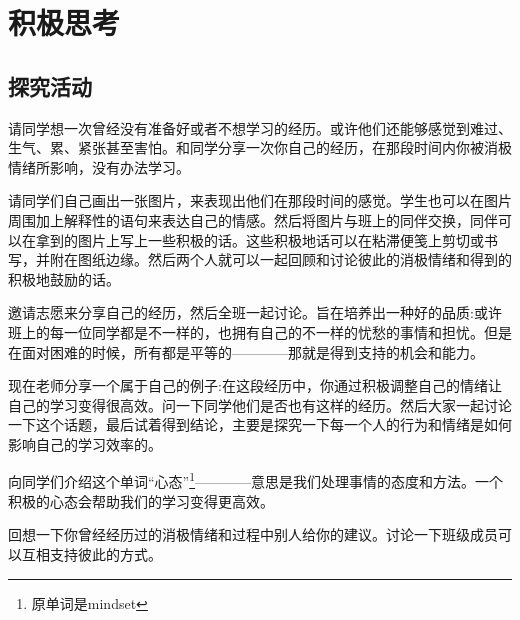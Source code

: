 \chapter{积极思考}
\section{探究活动}
    请同学想一次曾经没有准备好或者不想学习的经历。或许他们还能够感觉到难过、生气、累、紧张甚至害怕。和同学分享一次你自己的经历，在那段时间内你被消极情绪所影响，没有办法学习。\par
    请同学们自己画出一张图片，来表现出他们在那段时间的感觉。学生也可以在图片周围加上解释性的语句来表达自己的情感。然后将图片与班上的同伴交换，同伴可以在拿到的图片上写上一些积极的话。这些积极地话可以在粘滞便笺上剪切或书写，并附在图纸边缘。然后两个人就可以一起回顾和讨论彼此的消极情绪和得到的积极地鼓励的话。\par
    邀请志愿来分享自己的经历，然后全班一起讨论。旨在培养出一种好的品质:或许班上的每一位同学都是不一样的，也拥有自己的不一样的忧愁的事情和担忧。但是在面对困难的时候，所有都是平等的————那就是得到支持的机会和能力。\par
    现在老师分享一个属于自己的例子:在这段经历中，你通过积极调整自己的情绪让自己的学习变得很高效。问一下同学他们是否也有这样的经历。然后大家一起讨论一下这个话题，最后试着得到结论，主要是探究一下每一个人的行为和情绪是如何影响自己的学习效率的。\par
    向同学们介绍这个单词“心态”\footnote{原单词是mindset}————意思是我们处理事情的态度和方法。一个积极的心态会帮助我们的学习变得更高效。\par
    回想一下你曾经经历过的消极情绪和过程中别人给你的建议。讨论一下班级成员可以互相支持彼此的方式。

